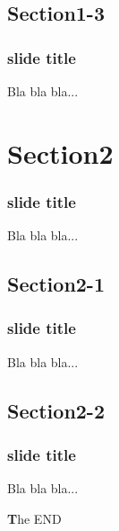 \documentclass[slidestop,compress,9pt]{beamer}
\begin{document}
\subsection{Section1-3}
\begin{frame}
\frametitle{slide title}
Bla bla bla...
\end{frame}



\section{Section2}
\begin{frame}
\frametitle{slide title}
Bla bla bla...
\end{frame}

\subsection{Section2-1}
\begin{frame}
\frametitle{slide title}
Bla bla bla...
\end{frame}

\subsection{Section2-2}
\begin{frame}
\frametitle{slide title}
Bla bla bla...
\end{frame}


\begin{frame}
\noframetitle

\begin{center}
{\Huge {\color{slidetitles} \textbf The END}}


\begin{minipage}{0.8\textwidth}
\end{minipage}
\end{center}
\end{frame}





\end{document}
